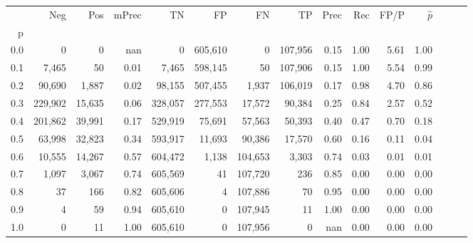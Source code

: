 \begin{tabular}{rrrrrrrrrrrrrrr}
\toprule
{} &      Neg &     Pos & mPrec &       TN &       FP &       FN &       TP &  Prec &   Rec &  FP/P & $\hat{p}$ \\
p   &          &         &       &          &          &          &          &       &       &       &           \\
\midrule
0.0 &        0 &       0 &   nan &        0 &  605,610 &        0 &  107,956 &  0.15 &  1.00 &  5.61 &      1.00 \\
0.1 &    7,465 &      50 &  0.01 &    7,465 &  598,145 &       50 &  107,906 &  0.15 &  1.00 &  5.54 &      0.99 \\
0.2 &   90,690 &   1,887 &  0.02 &   98,155 &  507,455 &    1,937 &  106,019 &  0.17 &  0.98 &  4.70 &      0.86 \\
0.3 &  229,902 &  15,635 &  0.06 &  328,057 &  277,553 &   17,572 &   90,384 &  0.25 &  0.84 &  2.57 &      0.52 \\
0.4 &  201,862 &  39,991 &  0.17 &  529,919 &   75,691 &   57,563 &   50,393 &  0.40 &  0.47 &  0.70 &      0.18 \\
0.5 &   63,998 &  32,823 &  0.34 &  593,917 &   11,693 &   90,386 &   17,570 &  0.60 &  0.16 &  0.11 &      0.04 \\
0.6 &   10,555 &  14,267 &  0.57 &  604,472 &    1,138 &  104,653 &    3,303 &  0.74 &  0.03 &  0.01 &      0.01 \\
0.7 &    1,097 &   3,067 &  0.74 &  605,569 &       41 &  107,720 &      236 &  0.85 &  0.00 &  0.00 &      0.00 \\
0.8 &       37 &     166 &  0.82 &  605,606 &        4 &  107,886 &       70 &  0.95 &  0.00 &  0.00 &      0.00 \\
0.9 &        4 &      59 &  0.94 &  605,610 &        0 &  107,945 &       11 &  1.00 &  0.00 &  0.00 &      0.00 \\
1.0 &        0 &      11 &  1.00 &  605,610 &        0 &  107,956 &        0 &   nan &  0.00 &  0.00 &      0.00 \\
\bottomrule
\end{tabular}
